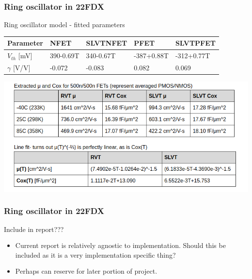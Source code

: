 \documentclass[t, screen, aspectratio=43]{beamer}
\begin{document}
\begin{frame}
	\frametitle{Ring oscillator in 22FDX}
	\begin{block}{Ring oscillator model - fitted parameters}
		\begin{table}[htb!]
			\tiny
			\centering
			\def\arraystretch{1.5}		
			\setlength\arrayrulewidth{0.75pt}
			\setlength{\tabcolsep}{1em} %
			\begin{tabular}{|l|l|l|l|l|}
				\hline 
				\rule[-1ex]{0pt}{2.5ex} \cellcolor{gray!40}\textbf{Parameter} & \cellcolor{gray!40}\textbf{NFET} & \cellcolor{gray!40}\textbf{SLVTNFET}& \cellcolor{gray!40}\textbf{PFET} & \cellcolor{gray!40}\textbf{SLVTPFET} \\ 
				\hline 
				\rule[-1ex]{0pt}{2.5ex} $V_{th}$ [mV] & 390-0.69T & 340-0.67T & -387+0.88T & -312+0.77T\\ 
				\hline 
				\rule[-1ex]{0pt}{2.5ex} $\gamma $ [V/V]  & -0.072 & -0.083 & 0.082 & 0.069\\ 
				\hline 
			\end{tabular} 
		\end{table}  
		\center\includegraphics[width=0.7\linewidth]{ro_model_fit.png}
	\end{block}
\end{frame}

\begin{frame}
	\frametitle{Ring oscillator in 22FDX}
	\begin{block}{Include in report???}
		\begin{itemize}
			\scriptsize
			\item Current report is relatively agnostic to implementation. Should this be included as it is a very implementation specific thing?
			\item Perhaps can reserve for later portion of project.
		\end{itemize}    
	\end{block}
\end{frame}
\end{document}
